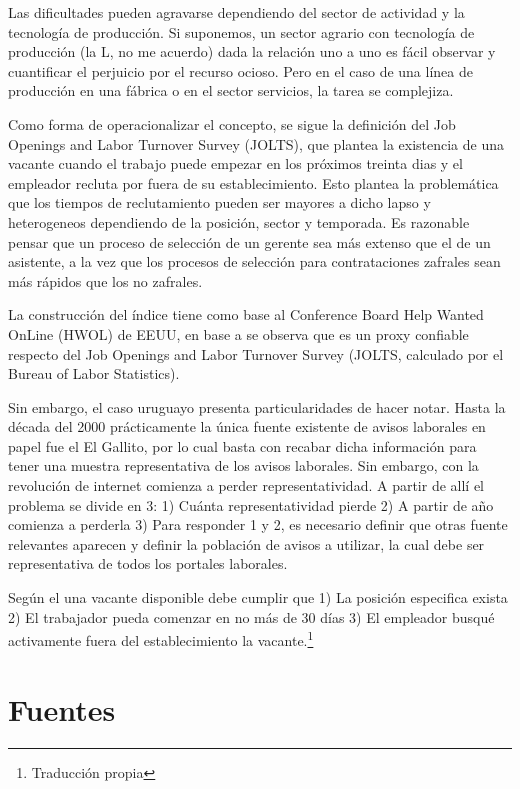 \documentclass[msc,oneside,a4paper]{udelar} %
\begin{document}
  Las dificultades pueden agravarse dependiendo del sector de actividad y la tecnología de producción. Si suponemos, un sector agrario con tecnología de producción (la L, no me acuerdo) dada la relación uno a uno es fácil observar y cuantificar el perjuicio por el recurso ocioso. Pero en el caso de una línea de producción en una fábrica o en el sector servicios, la tarea se complejiza.
  
  Como forma de operacionalizar el concepto, se sigue la definición del Job Openings and Labor Turnover Survey (JOLTS), que plantea la existencia de una vacante cuando el trabajo puede empezar en los próximos treinta dias y el empleador recluta por fuera de su establecimiento. Esto plantea la problemática que los tiempos de reclutamiento pueden ser mayores a dicho lapso y heterogeneos dependiendo de la posición, sector y temporada. Es razonable pensar que un proceso de selección de un gerente sea más extenso que el de un asistente, a la vez que los procesos de selección para contrataciones zafrales sean más rápidos que los no zafrales.
  
  La construcción del índice tiene como base al Conference Board Help Wanted OnLine (HWOL) de EEUU, en base a \cite{Barnichon2010, Shimer2005} se observa que es un proxy confiable respecto del Job Openings and Labor Turnover Survey (JOLTS, calculado por el Bureau of Labor Statistics).
  
  Sin embargo, el caso uruguayo presenta particularidades de hacer notar. Hasta la década del 2000 prácticamente la única fuente existente de avisos laborales en papel fue el El Gallito, por lo cual basta con recabar dicha información para tener una muestra representativa de los avisos laborales. Sin embargo, con la revolución de internet comienza a perder representatividad. A partir de allí el problema se divide en 3: 1) Cuánta representatividad pierde 2) A partir de año comienza a perderla 3) Para responder 1 y 2, es necesario definir que otras fuente relevantes aparecen y definir la población de avisos a utilizar, la cual debe ser representativa de todos los portales laborales.
  
  Según el \cite{JOLTS} una vacante disponible debe cumplir que 1) La posición especifica exista 2) El trabajador pueda comenzar en no más de 30 días 3) El empleador busqué activamente fuera del establecimiento la vacante.\footnote{Traducción propia}
  
  \section{Fuentes}
  
\end{document}
